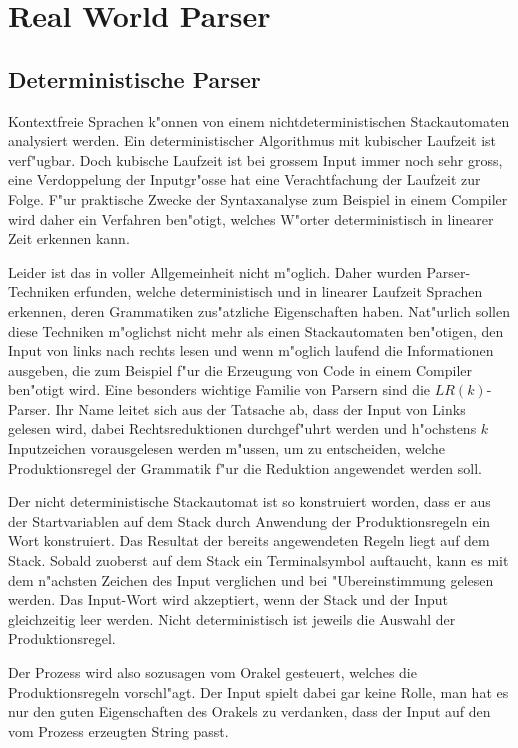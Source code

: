 \section{Real World Parser}
\subsection{Deterministische Parser}
Kontextfreie Sprachen k"onnen von einem nichtdeterministischen
Stackautomaten analysiert werden. Ein deterministischer Algorithmus mit
kubischer Laufzeit ist verf"ugbar. Doch kubische Laufzeit ist bei grossem
Input immer noch sehr gross, eine Verdoppelung der Inputgr"osse hat eine
Verachtfachung der Laufzeit zur Folge. 
F"ur praktische Zwecke der Syntaxanalyse
zum Beispiel in einem Compiler wird daher ein Verfahren ben"otigt, welches
W"orter deterministisch in linearer Zeit erkennen kann.

Leider ist das in voller Allgemeinheit nicht m"oglich. Daher wurden Parser-Techniken
erfunden, welche deterministisch und in linearer Laufzeit Sprachen erkennen,
deren Grammatiken zus"atzliche Eigenschaften haben. Nat"urlich sollen diese
Techniken m"oglichst nicht mehr als einen Stackautomaten ben"otigen, den Input
von links nach rechts lesen und wenn m"oglich laufend die Informationen ausgeben,
die zum Beispiel f"ur die Erzeugung von Code in einem Compiler ben"otigt wird.
Eine besonders wichtige Familie von Parsern sind die $LR(k)$-Parser.
Ihr Name leitet sich aus der Tatsache ab, dass der Input von Links gelesen wird,
dabei Rechtsreduktionen durchgef"uhrt werden und h"ochstens $k$ Inputzeichen
vorausgelesen werden m"ussen, um zu entscheiden, welche Produktionsregel der
Grammatik f"ur die Reduktion angewendet werden soll.

Der nicht deterministische Stackautomat ist so konstruiert worden, dass er aus
der Startvariablen auf dem Stack durch Anwendung der Produktionsregeln 
ein Wort konstruiert. Das Resultat der bereits angewendeten Regeln
liegt auf dem Stack. Sobald zuoberst auf dem Stack ein Terminalsymbol auftaucht,
kann es mit dem n"achsten Zeichen des Input verglichen und bei "Ubereinstimmung
gelesen werden. Das Input-Wort wird akzeptiert, wenn der Stack und der Input
gleichzeitig leer werden. Nicht deterministisch ist jeweils die Auswahl der
Produktionsregel.

Der Prozess wird also sozusagen vom Orakel gesteuert,
welches die Produktionsregeln vorschl"agt. Der Input spielt dabei gar keine
Rolle, man hat es nur den guten Eigenschaften des Orakels zu verdanken,
dass der Input auf den vom Prozess erzeugten String passt.

